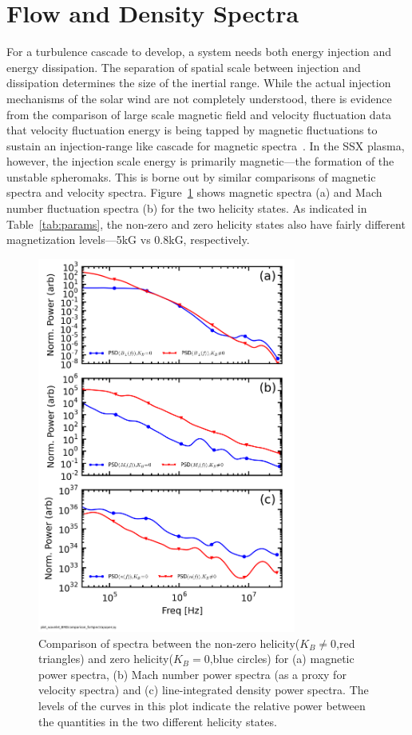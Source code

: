 \documentclass[aip,prl,amsmath,amssymb,reprint,superscriptaddress]{revtex4-1} %
\begin{document}
\section{Flow and Density Spectra}\label{sec:flowdens}

For a turbulence cascade to develop, a system needs both energy injection and energy dissipation. The separation of spatial scale between injection and dissipation determines the size of the inertial range. While the actual injection mechanisms of the solar wind are not completely understood, there is evidence from the comparison of large scale magnetic field and velocity fluctuation data that velocity fluctuation energy is being tapped by magnetic fluctuations to sustain an injection-range like cascade for magnetic spectra~\cite{roberts10}. In the SSX plasma, however, the injection scale energy is primarily magnetic---the formation of the unstable spheromaks. This is borne out by similar comparisons of magnetic spectra and velocity spectra. Figure~\ref{fig:BvsFlow} shows magnetic spectra (a) and Mach number fluctuation spectra (b) for the two helicity states. As indicated in Table~\ref{tab:params}, the non-zero and zero helicity states also have fairly different magnetization levels---5kG vs 0.8kG, respectively.

\begin{figure}[!htbp]
\centerline{
\includegraphics[width=8.5cm]{BvsFlowvsDensspec_2fluxes_separateplots_40t60us}}
\caption{\label{fig:BvsFlow} Comparison of spectra between the non-zero helicity($K_{B}\neq 0$,red triangles) and zero helicity($K_{B}=0$,blue circles) for (a) magnetic power spectra, (b) Mach number power spectra (as a proxy for velocity spectra) and (c) line-integrated density power spectra. The levels of the curves in this plot indicate the relative power between the quantities in the two different helicity states.}
\end{figure}
\end{document}
